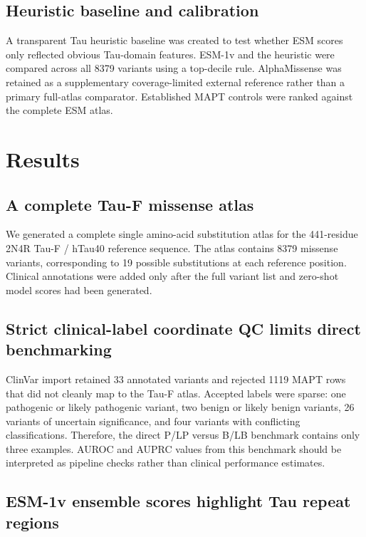 \documentclass[11pt]{article}
\begin{document}
\subsection{Heuristic baseline and calibration}

A transparent Tau heuristic baseline was created to test whether ESM scores only
reflected obvious Tau-domain features. ESM-1v and the heuristic were compared
across all 8379 variants using a top-decile rule. AlphaMissense was retained as a
supplementary coverage-limited external reference rather than a primary full-atlas
comparator. Established MAPT controls were ranked against the complete ESM atlas.
\section{Results}

\subsection{A complete Tau-F missense atlas}

We generated a complete single amino-acid substitution atlas for the 441-residue
2N4R Tau-F / hTau40 reference sequence. The atlas contains 8379 missense
variants, corresponding to 19 possible substitutions at each reference position.
Clinical annotations were added only after the full variant list and zero-shot
model scores had been generated.

\subsection{Strict clinical-label coordinate QC limits direct benchmarking}

ClinVar import retained 33 annotated variants and rejected 1119 MAPT rows that
did not cleanly map to the Tau-F atlas. Accepted labels were sparse: one
pathogenic or likely pathogenic variant, two benign or likely benign variants,
26 variants of uncertain significance, and four variants with conflicting
classifications. Therefore, the direct P/LP versus B/LB benchmark contains only
three examples. AUROC and AUPRC values from this benchmark should be interpreted
as pipeline checks rather than clinical performance estimates.

\subsection{ESM-1v ensemble scores highlight Tau repeat regions}
\end{document}
